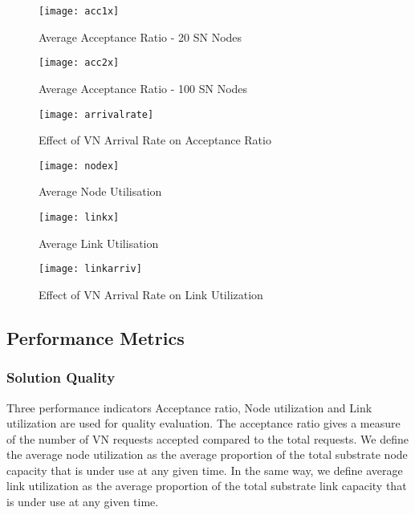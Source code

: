 \documentclass[journal]{IEEEtran}
\begin{document}
\begin{figure*}[t]
\setlength{\abovecaptionskip}{7pt plus 0pt minus 0pt}
\setlength{\belowcaptionskip}{7pt plus 0pt minus 0pt}
\begin{minipage}{.33\textwidth}
\centering
\resizebox{.99\textwidth}{!}
{\texttt{[image: acc1x]}}
  \caption{Average Acceptance Ratio - 20 SN Nodes}\label{AcceptanceRatio1}
\end{minipage}
\begin{minipage}{.33\textwidth}
\centering
\resizebox{.99\textwidth}{!}
{\texttt{[image: acc2x]}}
  \caption{Average Acceptance Ratio - 100 SN Nodes}\label{AcceptanceRatio2}
\end{minipage}
\begin{minipage}{.33\textwidth}
\centering
\resizebox{0.99\textwidth}{!}
{\texttt{[image: arrivalrate]}}
  \caption{Effect of VN Arrival Rate on Acceptance Ratio}
  \label{arrivalrate}
\end{minipage}
\begin{minipage}{.33\textwidth}
\centering
\resizebox{0.99\textwidth}{!}
{\texttt{[image: nodex]}}
  \caption{Average Node Utilisation}
  \label{NodeUtilization}
\end{minipage}
\begin{minipage}{.33\textwidth}
\resizebox{.99\textwidth}{!}
{\texttt{[image: linkx]}}
  \caption{Average Link Utilisation}
  \label{LinkUtilization}
\end{minipage}
\begin{minipage}{.33\textwidth}
\resizebox{.99\textwidth}{!}
{\texttt{[image: linkarriv]}}
  \caption{Effect of VN Arrival Rate on Link Utilization}
  \label{linkarriv}
\end{minipage}

\end{figure*}

\subsection{Performance Metrics}
\subsubsection{Solution Quality} Three performance indicators  Acceptance ratio, Node utilization and Link utilization  are used for quality evaluation. The acceptance ratio gives a measure of the number of \ac{VN} requests accepted compared to the total requests. We define the average node utilization as the average proportion of the total substrate node capacity that is under use at any given time. In the same way, we define average link utilization as the average proportion of the total substrate link capacity that is under use at any given time.
\end{document}
